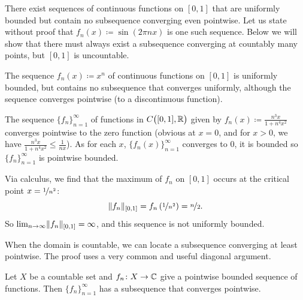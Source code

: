 \begin{example}
There exist sequences of 
continuous functions
on $[0,1]$ that are uniformly bounded but contain no subsequence converging
even pointwise.
Let us state without proof that $f_n(x) \coloneqq \sin (2\pi n x)$ is one
such sequence.
Below we will show that there must always exist
a subsequence converging at countably
many points, but $[0,1]$ is uncountable.
\end{example}

\begin{example}
The sequence $f_n(x) \coloneqq x^n$ of continuous functions on $[0,1]$
is uniformly bounded, but contains no subsequence that converges
uniformly,
although the sequence converges pointwise (to a discontinuous function).
\end{example}

\begin{example}
The sequence $\{ f_n \}_{n=1}^\infty$ of functions in $C\bigl([0,1],{\mathbb{R}}\bigr)$ given by
$f_n(x) \coloneqq \frac{n^3x}{1+n^4x^2}$
converges pointwise to the zero function (obvious at $x=0$, and for $x > 0$,
we have $\frac{n^3x}{1+n^4x^2} \leq \frac{1}{nx}$).
As for each $x$, $\{f_n(x)\}_{n=1}^\infty$ converges to 0, it is bounded
so $\{ f_n \}_{n=1}^\infty$ is pointwise bounded.

Via calculus, we find that the maximum of
$f_n$ on
$[0,1]$ occurs at the critical point
$x=\nicefrac{1}{n^2}$:
\begin{equation*}
\lVert {f_n} \rVert_{[0,1]}
=
f_n\left(\nicefrac{1}{n^2}\right)
= \nicefrac{n}{2} .
\end{equation*}
So $\lim_{n\to\infty} \lVert {f_n} \rVert_{[0,1]} = \infty$, and
this sequence is not uniformly bounded.
\end{example}

When the domain is countable, we can locate a subsequence
converging at least pointwise.
The proof uses a very common and useful diagonal argument.

\begin{prop} \label{prop:subsequenceoncountableX}
Let $X$ be a countable set and $f_n \colon X \to {\mathbb{C}}$ give a pointwise bounded
sequence of functions.  Then $\{ f_n \}_{n=1}^\infty$ has a subsequence that converges
pointwise.
\end{prop}

